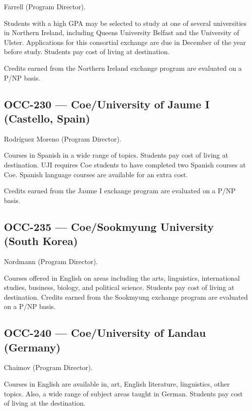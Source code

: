 \documentclass[
  letterpaper,
]{scrbook}
\begin{document}
Farrell (Program Director).

Students with a high GPA may be selected to study at one of several
universities in Northern Ireland, including Queens University Belfast
and the University of Ulster. Applications for this consortial exchange
are due in December of the year before study. Students pay cost of
living at destination.

Credits earned from the Northern Ireland exchange program are evaluated
on a P/NP basis.

\hypertarget{occ-230-coeuniversity-of-jaume-i-castello-spain}{%
\subsection{OCC-230 --- Coe/University of Jaume I (Castello,
Spain)}\label{occ-230-coeuniversity-of-jaume-i-castello-spain}}

Rodríguez Moreno (Program Director).

Courses in Spanish in a wide range of topics. Students pay cost of
living at destination. UJI requires Coe students to have completed two
Spanish courses at Coe. Spanish language courses are available for an
extra cost.

Credits earned from the Jaume I exchange program are evaluated on a P/NP
basis.

\hypertarget{occ-235-coesookmyung-university-south-korea}{%
\subsection{OCC-235 --- Coe/Sookmyung University (South
Korea)}\label{occ-235-coesookmyung-university-south-korea}}

Nordmann (Program Director).

Courses offered in English on areas including the arts, linguistics,
international studies, business, biology, and political science.
Students pay cost of living at destination. Credits earned from the
Sookmyung exchange program are evaluated on a P/NP basis.

\hypertarget{occ-240-coeuniversity-of-landau-germany}{%
\subsection{OCC-240 --- Coe/University of Landau
(Germany)}\label{occ-240-coeuniversity-of-landau-germany}}

Chaimov (Program Director).

Courses in English are available in, art, English literature,
linguistics, other topics. Also, a wide range of subject areas taught in
German. Students pay cost of living at the destination.
\end{document}
